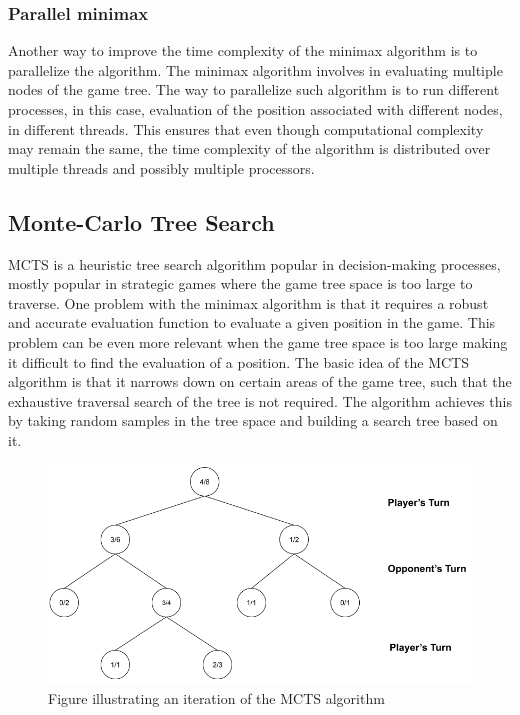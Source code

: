 \subsubsection{Parallel minimax}
Another way to improve the time complexity of the minimax algorithm is to parallelize the algorithm. The minimax algorithm involves in evaluating multiple nodes of the game tree. The way to parallelize such algorithm is to run different processes, in this case, evaluation of the position associated with different nodes, in different threads. This ensures that even though computational complexity may remain the same, the time complexity of the algorithm is distributed over multiple threads and possibly multiple processors.


\subsection{Monte-Carlo Tree Search}\label{sec:MCTS}
\gls{MCTS} \citep{Coulom2006Efficient} is a heuristic tree search algorithm popular in decision-making processes, mostly popular in strategic games where the game tree space is too large to traverse. One problem with the minimax algorithm is that it requires a robust and accurate evaluation function to evaluate a given position in the game. This problem can be even more relevant when the game tree space is too large making it difficult to find the evaluation of a position. The basic idea of the \gls{MCTS} algorithm is that it narrows down on certain areas of the game tree, such that the exhaustive traversal search of the tree is not required. The algorithm achieves this by taking random samples in the tree space and building a search tree based on it.

\begin{figure}[!ht]
    \centering
    \includegraphics[width = \linewidth]{../img/MCTS1.png}
    \caption{Figure illustrating an iteration of the MCTS algorithm}
    \label{fig:MCTS1}
\end{figure}

